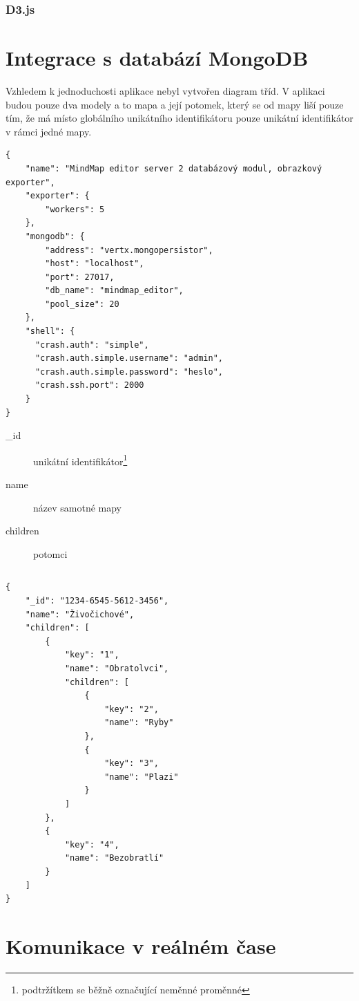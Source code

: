 \subsubsection{D3.js}

\section{Integrace s databází MongoDB}

Vzhledem k jednoduchosti aplikace nebyl vytvořen diagram tříd. V aplikaci budou pouze dva modely a to mapa a její potomek, který se od mapy liší pouze tím, že má místo globálního unikátního identifikátoru pouze unikátní identifikátor v rámci jedné mapy.

\begin{lstlisting}[caption={Konfigurace serveru 2},label=confServ2]
{
    "name": "MindMap editor server 2 databázový modul, obrazkový exporter",
    "exporter": {
        "workers": 5
    },
    "mongodb": {
        "address": "vertx.mongopersistor",
        "host": "localhost",
        "port": 27017,
        "db_name": "mindmap_editor",
        "pool_size": 20
    },
    "shell": {
      "crash.auth": "simple",
      "crash.auth.simple.username": "admin",
      "crash.auth.simple.password": "heslo",
      "crash.ssh.port": 2000
    }
}
\end{lstlisting}

\begin{description}
\item[\_id] unikátní identifikátor\footnote{podtržítkem se běžně označující neměnné proměnné}
\item[name] název samotné mapy
\item[children] potomci
\end{description}

\begin{lstlisting}
\end{lstlisting}

\begin{lstlisting}
{
	"_id": "1234-6545-5612-3456",
	"name": "Živočichové",
	"children": [
		{
			"key": "1",
			"name": "Obratolvci",
			"children": [
				{
					"key": "2",
					"name": "Ryby"
				},
				{
					"key": "3",
					"name": "Plazi"
				}
			]
		},
		{
			"key": "4",
			"name": "Bezobratlí"
		}
	]
}
\end{lstlisting}

\section{Komunikace v reálném čase}\label{sec:realTimeCommunication}

